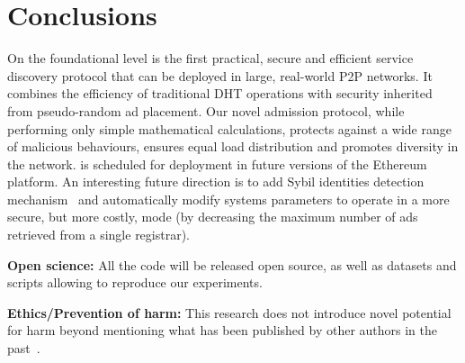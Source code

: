
\section{Conclusions}
\label{sec:con}
On the foundational level \sysname is the first practical, secure and efficient service discovery protocol that can be deployed in large, real-world P2P networks. It combines the efficiency of traditional DHT operations with security inherited from pseudo-random ad placement. Our novel admission protocol, while performing only simple mathematical calculations, protects against a wide range of malicious behaviours, ensures equal load distribution and promotes diversity in the network.
\sysname is scheduled for deployment in future versions of the Ethereum platform. 
An interesting future direction is to add Sybil identities detection mechanism~\cite{cholez2010efficient} and automatically modify systems parameters to operate in a more secure, but more costly, mode (\eg by decreasing the maximum number of ads retrieved from a single registrar). 


{\footnotesize

\smallskip

\noindent
\textbf{Open science:} All the code will be released open source, as well as datasets and scripts allowing to reproduce our experiments.

\smallskip

\footnotesize
\noindent
\textbf{Ethics/Prevention of harm:} This research does not introduce novel potential for harm beyond mentioning what has been published by other authors in the past~\cite{marcus2018low,henningsen2019eclipsing}.
}